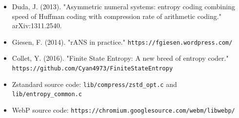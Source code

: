 \begin{itemize}
    \item Duda, J. (2013). "Asymmetric numeral systems: entropy coding combining speed of Huffman coding with compression rate of arithmetic coding." arXiv:1311.2540.
    \item Giesen, F. (2014). "rANS in practice." \texttt{https://fgiesen.wordpress.com/}
    \item Collet, Y. (2016). "Finite State Entropy: A new breed of entropy coder." \texttt{https://github.com/Cyan4973/FiniteStateEntropy}
    \item Zstandard source code: \texttt{lib/compress/zstd\_opt.c} and \texttt{lib/entropy\_common.c}
    \item WebP source code: \texttt{https://chromium.googlesource.com/webm/libwebp/}
\end{itemize}
